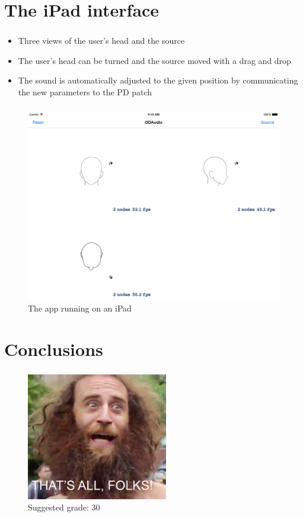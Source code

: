 \documentclass{beamer}
\begin{document}
	\section{The iPad interface}

	\begin{frame}
		\frametitle{\insertsection}
		\begin{itemize}
			\item Three views of the user's head and the source
			\item The user's head can be turned and the source moved with a drag and drop
			\item The sound is automatically adjusted to the given position by communicating the
				new parameters to the PD patch
		\end{itemize}
	\end{frame}

	\begin{frame}
		\frametitle{\insertsection}
		\begin{figure}
			\centering
			\includegraphics[width=0.9\textheight]{images/iOS_screenshot_0.png}
			\caption{The app running on an iPad}
			\label{fig:ios_app}
		\end{figure}
	\end{frame}

	\section*{Conclusions}

	\begin{frame}
		\frametitle{\insertsection}
		\begin{figure}
			\centering
			\includegraphics[width=0.55\textwidth]{images/alas.png}
            \caption{Suggested grade: 30}
		\end{figure}
	\end{frame}
\end{document}
